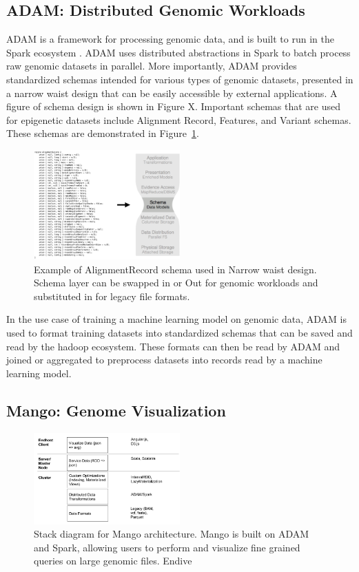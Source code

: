 \documentclass{sig-alternate-05-2015}
\begin{document}
\subsection{ADAM: Distributed Genomic Workloads}
ADAM is a framework for processing genomic data, and is built to run in the Spark ecosystem \cite{adam}. ADAM uses distributed abstractions in Spark to batch process raw genomic datasets in parallel. More importantly, ADAM provides standardized schemas intended for various types of genomic datasets, presented in a narrow waist design that can be easily accessible by external applications. A figure of schema design is shown in Figure X. Important schemas that are used for epigenetic datasets include Alignment Record, Features, and Variant schemas. These schemas are demonstrated in Figure~\ref{fig:adam}. \\

 \begin{figure}
   \label{fig:adam}
   \includegraphics[width=0.5\textwidth]{figures/adamSchema.png}
   \caption{Example of AlignmentRecord schema used in
   Narrow waist design. Schema layer can be swapped in or
   Out for genomic workloads and substituted in for legacy file formats.}
 \end{figure}

In the use case of training a machine learning model on genomic data, ADAM is used to format training
 datasets into standardized schemas that can be saved and read by the hadoop ecosystem. These formats can then be read by ADAM and joined or aggregated to preprocess datasets into records read by a machine learning model.


\subsection{Mango: Genome Visualization}

\begin{figure}
  \label{fig:mango}
  \includegraphics[width=0.5\textwidth]{figures/mango.png}
  \caption{Stack diagram for Mango architecture. Mango is built on ADAM and Spark, allowing users to perform and visualize fine grained queries on large genomic files.
  Endive}
\end{figure}
\end{document}
